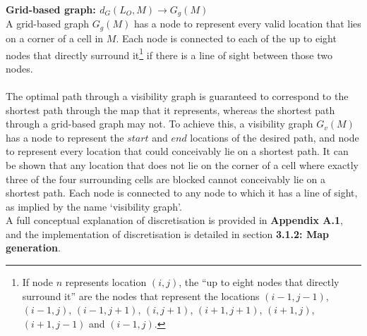 \documentclass[12pt,notitlepage]{report}
\begin{document}
\noindent
{\bfseries Grid-based graph: $d_{G}(L_{O},M) \rightarrow G_{g}(M)$}\\
\noindent
A grid-based graph $G_{g}(M)$ has a node to represent every valid location that lies on a corner of a cell in $M$. Each node is connected to each of the up to eight nodes that directly surround it\footnote{If node $n$ represents location $(i,j)$, the ``up to eight nodes that directly surround it'' are the nodes that represent the locations $(i-1,j-1)$, $(i-1,j)$, $(i-1,j+1)$, $(i,j+1)$, $(i+1,j+1)$, $(i+1,j)$, $(i+1,j-1)$ and $(i-1,j)$.} if there is a line of sight between those two nodes.\\

\\
\noindent
The optimal path through a visibility graph is guaranteed to correspond to the shortest path through the map that it represents, whereas the shortest path through a grid-based graph may not\cite{Nash12}. To achieve this, a visibility graph $G_{v}(M)$ has a node to represent the $start$ and $end$ locations of the desired path, and node to represent every location that could conceivably lie on a shortest path. It can be shown\cite{Nash12} that any location that does not lie on the corner of a cell where exactly three of the four surrounding cells are blocked cannot conceivably lie on a shortest path. Each node is connected to any node to which it has a line of sight, as implied by the name `visibility graph'.\\

\noindent
A full conceptual explanation of discretisation is provided in {\bfseries Appendix A.1}, and the implementation of discretisation is detailed in section {\bfseries 3.1.2: Map generation}.
\end{document}
